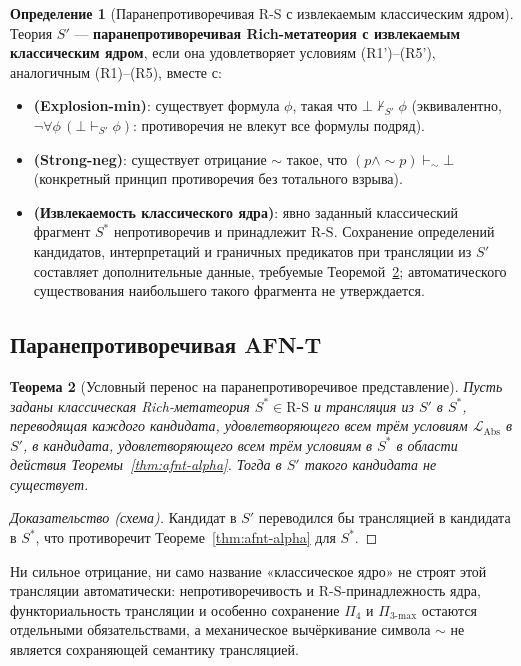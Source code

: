 \documentclass[11pt]{article}
\theoremstyle{plain}
\newtheorem{theorem}{Теорема}[section]
\theoremstyle{definition}
\newtheorem{definition}[theorem]{Определение}
\newcommand{\RS}{\mathrm{R\text{-}S}}
\newcommand{\LAbs}{\mathcal{L}_{\mathrm{Abs}}}
\begin{document}
\begin{definition}[Паранепротиворечивая R-S с извлекаемым классическим ядром]\label{def:paraconsistent-rs}
Теория $S'$ — \textbf{паранепротиворечивая Rich-метатеория с извлекаемым классическим ядром}, если она удовлетворяет условиям (R1')--(R5'), аналогичным (R1)--(R5), вместе с:
\begin{itemize}
\item \textbf{(Explosion-min)}: существует формула $\phi$, такая что $\bot \not\vdash_{S'} \phi$ (эквивалентно, $\neg\forall\phi\,(\bot \vdash_{S'} \phi)$: противоречия не влекут все формулы подряд).
\item \textbf{(Strong-neg)}: существует отрицание $\sim$ такое, что $(p \wedge \sim p) \vdash_\sim \bot$ (конкретный принцип противоречия без тотального взрыва).
\item \textbf{(Извлекаемость классического ядра)}: явно заданный классический фрагмент $S^*$ непротиворечив и принадлежит $\RS$. Сохранение определений кандидатов, интерпретаций и граничных предикатов при трансляции из $S'$ составляет дополнительные данные, требуемые Теоремой~\ref{thm:paraconsistent-afnt}; автоматического существования наибольшего такого фрагмента не утверждается.
\end{itemize}
\end{definition}

\subsection{Паранепротиворечивая AFN-T}

\begin{theorem}[Условный перенос на паранепротиворечивое представление]\label{thm:paraconsistent-afnt}
Пусть заданы классическая Rich-метатеория $S^* \in \RS$ и трансляция из $S'$ в $S^*$, переводящая каждого кандидата, удовлетворяющего всем трём условиям $\LAbs$ в $S'$, в кандидата, удовлетворяющего всем трём условиям в $S^*$ в области действия Теоремы~\ref{thm:afnt-alpha}. Тогда в $S'$ такого кандидата не существует.
\end{theorem}
\begin{proof}[Доказательство (схема)]
Кандидат в $S'$ переводился бы трансляцией в кандидата в $S^*$, что противоречит Теореме~\ref{thm:afnt-alpha} для $S^*$.
\end{proof}
Ни сильное отрицание, ни само название «классическое ядро» не строят этой трансляции автоматически: непротиворечивость и $\RS$-принадлежность ядра, функториальность трансляции и особенно сохранение $\Pi_4$ и $\Pi_{3\text{-max}}$ остаются отдельными обязательствами, а механическое вычёркивание символа $\sim$ не является сохраняющей семантику трансляцией.
\end{document}
